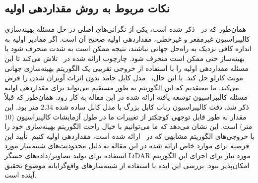\subsection{نکات مربوط به روش مقداردهی اولیه}
همان‌طور که در~\cite{khorrambakht2023graph} ذکر شده است، یکی از نگرانی‌های اصلی در حل مسئله بهینه‌سازی کالیبراسیون غیرمقعر و غیرخطی، مقداردهی اولیه صحیح آن است. اگر مقادیر اولیه به اندازه کافی نزدیک به راه‌حل جهانی نباشند، نتیجه ممکن است به شدت منحرف شود یا بهینه‌ساز حتی ممکن است منحرف شود. چارچوب ارائه شده در~\cite{khorrambakht2023graph} تلاش می‌کند تا این مسئله مقداردهی اولیه را با استفاده از خروجی تقریبی یک الگوریتم بهینه‌سازی جهانی مونت کارلو حل کند. با این حال،~\cite{khorrambakht2023graph} مدل کابل جامد بدون اثرات آویزان شدن را فرض می‌کند. ما معتقدیم که این الگوریتم به طور مستقیم می‌تواند برای مقداردهی اولیه مسئله کالیبراسیون توسعه یافته ارائه شده در این مقاله به کار رود. همان‌طور که قبلاً ذکر شد، دقت کالیبراسیون ربات کابل بزرگ با مدل کابل ساده شده $2.34$ متر بود. این مقدار به طور قابل توجهی کوچکتر از تغییرات ما در طول آزمایشات کالیبراسیون ($10$ متر) است. این نشان می‌دهد که ما می‌توانیم با خیال راحت الگوریتم بهینه‌سازی خود را با خروجی‌های الگوریتم مشابهی که در~\cite{khorrambakht2023graph} ارائه شده است، مقداردهی اولیه کنیم. تأیید این فرضیه برای موارد خاص ارائه شده در این مقاله به دلیل محدودیت‌های شبیه‌ساز مورد استفاده برای تولید تصاویر/داده‌های حسگر LiDAR مورد نیاز برای اجرای این الگوریتم امکان‌پذیر نبود. بررسی این ایده با استفاده از شبیه‌سازهای واقع‌گرایانه موضوع تحقیق آینده است.
